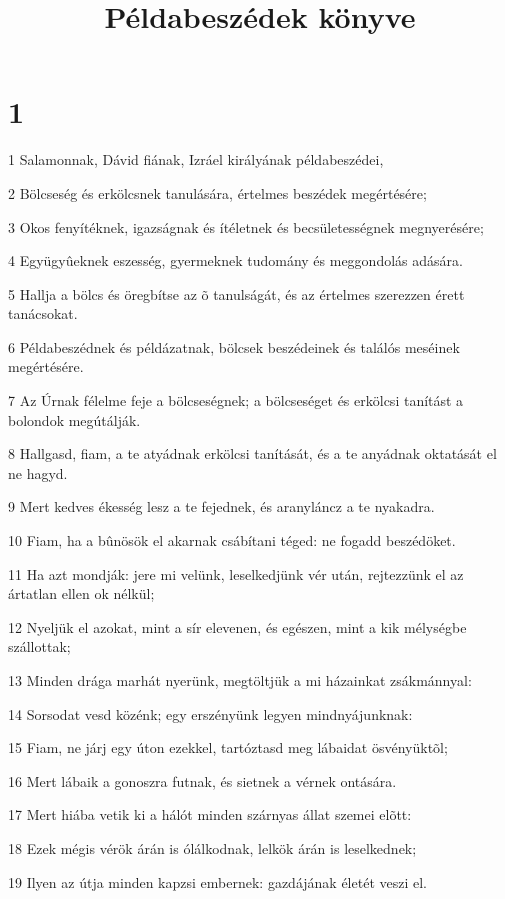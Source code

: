 

\title{Példabeszédek könyve}


\chapter{1}

\par 1 Salamonnak, Dávid fiának, Izráel királyának példabeszédei,
\par 2 Bölcseség és erkölcsnek tanulására, értelmes beszédek megértésére;
\par 3 Okos fenyítéknek, igazságnak és ítéletnek és becsületességnek megnyerésére;
\par 4 Együgyûeknek eszesség, gyermeknek tudomány és meggondolás adására.
\par 5 Hallja a bölcs és öregbítse az õ tanulságát, és az értelmes szerezzen érett tanácsokat.
\par 6 Példabeszédnek és példázatnak, bölcsek beszédeinek és találós meséinek megértésére.
\par 7 Az Úrnak félelme feje a bölcseségnek; a bölcseséget és erkölcsi tanítást a bolondok megútálják.
\par 8 Hallgasd, fiam, a te atyádnak erkölcsi tanítását, és a te anyádnak oktatását el ne hagyd.
\par 9 Mert kedves ékesség lesz a te fejednek, és aranyláncz a te nyakadra.
\par 10 Fiam, ha a bûnösök el akarnak csábítani téged: ne fogadd beszédöket.
\par 11 Ha azt mondják: jere mi velünk, leselkedjünk vér után, rejtezzünk el az ártatlan ellen ok nélkül;
\par 12 Nyeljük el azokat, mint a sír elevenen, és egészen, mint a kik mélységbe szállottak;
\par 13 Minden drága marhát nyerünk, megtöltjük a mi házainkat zsákmánnyal:
\par 14 Sorsodat vesd közénk; egy erszényünk legyen mindnyájunknak:
\par 15 Fiam, ne járj egy úton ezekkel, tartóztasd meg lábaidat ösvényüktõl;
\par 16 Mert lábaik a gonoszra futnak, és sietnek a vérnek ontására.
\par 17 Mert hiába vetik ki a hálót minden szárnyas állat szemei elõtt:
\par 18 Ezek mégis vérök árán is ólálkodnak, lelkök árán is leselkednek;
\par 19 Ilyen az útja minden kapzsi embernek: gazdájának életét veszi el.
